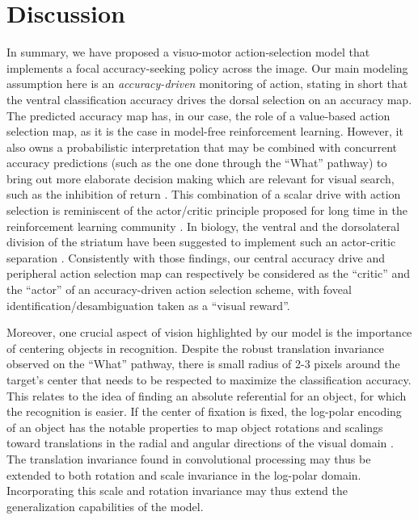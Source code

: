 
\section*{Discussion} \label{sec:discussion}

In summary, we have proposed a visuo-motor action-selection model that implements a focal accuracy-seeking policy across the image. 
Our main modeling assumption here is an \emph{accuracy-driven} monitoring of action, stating in short that the ventral classification accuracy drives the dorsal selection on an accuracy map. 
The predicted accuracy map has, in our case, the role of a value-based action selection map, as it is the case in model-free reinforcement learning. However, it also owns a probabilistic interpretation that may be combined with concurrent accuracy predictions (such as the one done through the ``What'' pathway) to bring out more elaborate decision making which are relevant for visual search, such as the inhibition of return \cite{Itti01}. This combination of a scalar drive with action selection is reminiscent of the actor/critic principle proposed for long time in the reinforcement learning community \cite{sutton1998reinforcement}. In biology, the ventral and the dorsolateral division of the striatum have been suggested to implement such an actor-critic separation \cite{joel2002actor,takahashi2008silencing}. Consistently with those findings, our central accuracy drive and peripheral action selection map can respectively be considered as the ``critic'' and the ``actor'' of an accuracy-driven action selection scheme, with foveal identification/desambiguation taken as a ``visual reward''.

Moreover, one crucial aspect of vision highlighted by our model is the importance of centering objects in recognition. Despite the robust translation invariance observed on the ``What'' pathway, there is small radius of 2-3 pixels around the target's center that needs to be respected to maximize the classification accuracy. This relates to the idea of finding an absolute referential for an object, for which the recognition is easier. If the center of fixation is fixed, the log-polar encoding of an object has the notable properties to map object rotations and scalings toward translations in the radial and angular directions of the visual domain \cite{Traver10}. The translation invariance found in convolutional processing may thus be extended to both rotation and scale invariance in the log-polar domain. Incorporating this scale and rotation invariance may thus extend the generalization capabilities of the model.



